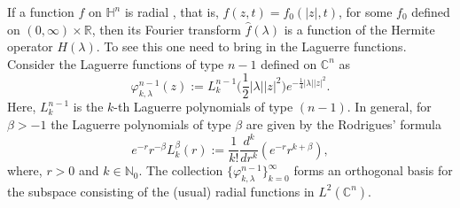 \documentclass[11pt, reqno]{amsart}
\theoremstyle{plain}
\newcommand{\R}{\ensuremath{\mathbb{R_+}}}
\theoremstyle{remark}
\theoremstyle{example}
\theoremstyle{definition}
\numberwithin{equation}{section}
\newcommand{\N}{\mathbb N}
\def\R{\mathbb{R}}
\def\Ha{\mathbb{H}^n}
\def\C{\mathbb{C}}
\newcommand{\Ca}{\mathbb{C}^n}
\begin{document}
If a  function $ f $ on $\Ha$ is radial , that is, $f( z,t)=f_{0}(|z|,t)$, for some $f_{0}$ defined on $(0, \infty) \times \R$,  then its Fourier transform $ \widehat{f}(\lambda) $ is a function of the Hermite operator $ H(\lambda)$. To see this one need to bring in the Laguerre functions. Consider the Laguerre functions of type $n-1$ defined on $\Ca$ as
\begin{equation}
\label{eq:Laguerre}
\varphi_{k,\lambda}^{n-1}(z) := L_k^{n-1}\Big( {\textstyle \frac{1}{2} } |\lambda||z|^2\Big)e^{-\frac14 |\lambda||z|^2}.
\end{equation}
Here, $ L_k^{n-1} $ is the $k$-th Laguerre polynomials of type $ (n-1)$. In general, for $\beta > -1$ the Laguerre polynomials of  type $\beta$ are given by the Rodrigues' formula  
\begin{equation*}
   e^{-r} r^{-\beta} L_{k}^{\beta}(r) := \frac{ 1 }{k!}  \frac{d^k}{dr^{k}} ( e^{-r} r^{k+\beta} ),
\end{equation*}
where, $r>0$ and $k \in \N_{0}$.  The collection $\{ \varphi_{k,\lambda}^{n-1}\}_{k=0}^{\infty}$ forms an orthogonal basis for the subspace consisting of  the (usual) radial functions in $ L^2(\C^n).$  
\end{document}
